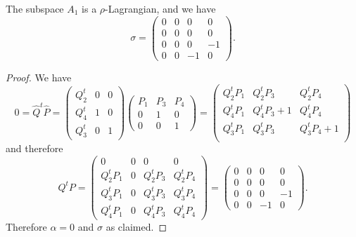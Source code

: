 \documentclass[10pt,a4paper]{amsart}
\begin{document}
\begin{proposition}\label{pRhoLagrangian}
The subspace $A_1$ is a $\rho$-Lagrangian, and we have 
\[
\sigma = \begin{pmatrix}
0 & 0 & 0 & 0\\
0 & 0 & 0 & 0\\
0 & 0 & 0 & -1\\
0 & 0 & -1 & 0
\end{pmatrix}.
\]
\end{proposition}

\begin{proof}
We have
\[ 
0= \widehat{Q}^t\widehat{P}
=
\begin{pmatrix}
	Q_2^t & 0& 0 \\
	Q_4^t& 1 & 0 \\
	Q_3^t & 0 & 1
\end{pmatrix}
\begin{pmatrix}
	P_1 & P_3 & P_4 \\
	0&  1& 0 \\
	0 & 0 & 1
\end{pmatrix}
= 
\begin{pmatrix}
	Q_2^tP_1 & Q_2^tP_3 & Q_2^tP_4 \\
	Q_4^tP_1 & Q_4^tP_3+1 & Q_4^tP_4 \\
	Q_3^tP_1 & Q_3^tP_3 & Q_3^tP_4+1 \\
\end{pmatrix}
\]
and therefore 
\[
Q^tP = \begin{pmatrix}
 0 & 0 & 0 & 0 \\
 Q^t_2P_1 & 0 & Q_2^t P_3 & Q_2^t P_4 \\
  Q^t_3P_1 & 0 & Q_3^t P_3 & Q_3^t P_4 \\
   Q^t_4P_1 & 0 & Q_4^t P_3 & Q_4^t P_4 
\end{pmatrix} =
\begin{pmatrix}
0 & 0 & 0 & 0\\
0 & 0 & 0 & 0\\
0 & 0 & 0 & -1\\
0 & 0 & -1 & 0
\end{pmatrix}.
\]
Therefore $\alpha=0$ and $\sigma$ as claimed. 
\end{proof}
\end{document}
